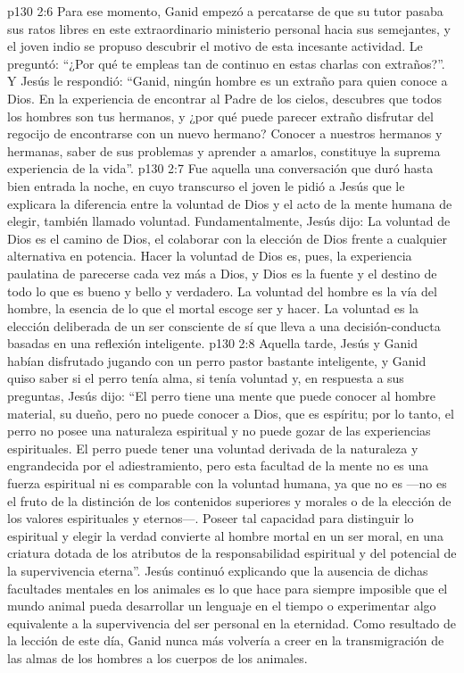 \vs p130 2:6 \pc Para ese momento, Ganid empezó a percatarse de que su tutor pasaba sus ratos libres en este extraordinario ministerio personal hacia sus semejantes, y el joven indio se propuso descubrir el motivo de esta incesante actividad. Le preguntó: “¿Por qué te empleas tan de continuo en estas charlas con extraños?”. Y Jesús le respondió: “Ganid, ningún hombre es un extraño para quien conoce a Dios. En la experiencia de encontrar al Padre de los cielos, descubres que todos los hombres son tus hermanos, y ¿por qué puede parecer extraño disfrutar del regocijo de encontrarse con un nuevo hermano? Conocer a nuestros hermanos y hermanas, saber de sus problemas y aprender a amarlos, constituye la suprema experiencia de la vida”.
\vs p130 2:7 Fue aquella una conversación que duró hasta bien entrada la noche, en cuyo transcurso el joven le pidió a Jesús que le explicara la diferencia entre la voluntad de Dios y el acto de la mente humana de elegir, también llamado voluntad. Fundamentalmente, Jesús dijo: La voluntad de Dios es el camino de Dios, el colaborar con la elección de Dios frente a cualquier alternativa en potencia. Hacer la voluntad de Dios es, pues, la experiencia paulatina de parecerse cada vez más a Dios, y Dios es la fuente y el destino de todo lo que es bueno y bello y verdadero. La voluntad del hombre es la vía del hombre, la esencia de lo que el mortal escoge ser y hacer. La voluntad es la elección deliberada de un ser consciente de sí que lleva a una decisión\hyp{}conducta basadas en una reflexión inteligente.
\vs p130 2:8 Aquella tarde, Jesús y Ganid habían disfrutado jugando con un perro pastor bastante inteligente, y Ganid quiso saber si el perro tenía alma, si tenía voluntad y, en respuesta a sus preguntas, Jesús dijo: “El perro tiene una mente que puede conocer al hombre material, su dueño, pero no puede conocer a Dios, que es espíritu; por lo tanto, el perro no posee una naturaleza espiritual y no puede gozar de las experiencias espirituales. El perro puede tener una voluntad derivada de la naturaleza y engrandecida por el adiestramiento, pero esta facultad de la mente no es una fuerza espiritual ni es comparable con la voluntad humana, ya que no es  ---no es el fruto de la distinción de los contenidos superiores y morales o de la elección de los valores espirituales y eternos---. Poseer tal capacidad para distinguir lo espiritual y elegir la verdad convierte al hombre mortal en un ser moral, en una criatura dotada de los atributos de la responsabilidad espiritual y del potencial de la supervivencia eterna”. Jesús continuó explicando que la ausencia de dichas facultades mentales en los animales es lo que hace para siempre imposible que el mundo animal pueda desarrollar un lenguaje en el tiempo o experimentar algo equivalente a la supervivencia del ser personal en la eternidad. Como resultado de la lección de este día, Ganid nunca más volvería a creer en la transmigración de las almas de los hombres a los cuerpos de los animales.
